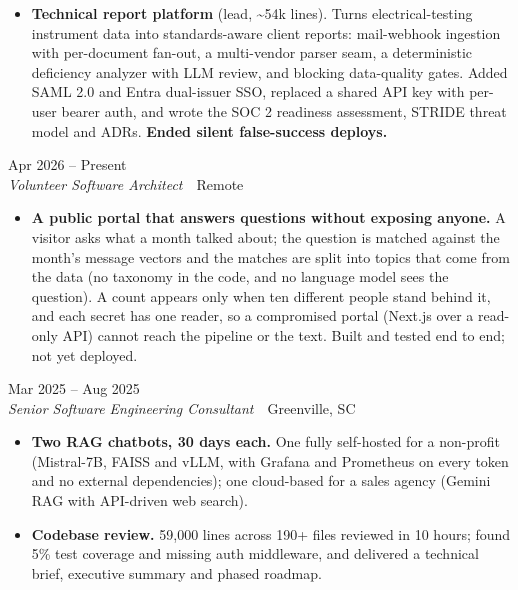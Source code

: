 \documentclass[10pt,letterpaper]{article}
\newcommand{\szmeta}{\fontsize{8pt}{10pt}\selectfont}
\begin{document}
\begin{itemize}
\item \textbf{Technical report platform} {\color{muted}(lead, \textasciitilde{}54k lines)}. Turns electrical-testing instrument data into standards-aware client reports: mail-webhook ingestion with per-document fan-out, a multi-vendor parser seam, a deterministic deficiency analyzer with LLM review, and blocking data-quality gates. Added SAML 2.0 and Entra dual-issuer SSO, replaced a shared API key with per-user bearer auth, and wrote the SOC 2 readiness assessment, STRIDE threat model and ADRs. \textbf{Ended silent false-success deploys.}
\end{itemize}
\vspace{3pt}
 \hfill {\color{muted}\szmeta Apr 2026 – Present}\\[1pt]
{\itshape Volunteer Software Architect}{\color{muted}\ \textbullet\ Remote}
\vspace{2pt}
\begin{itemize}
\item \textbf{A public portal that answers questions without exposing anyone.} A visitor asks what a month talked about; the question is matched against the month's message vectors and the matches are split into topics that come from the data (no taxonomy in the code, and no language model sees the question). A count appears only when ten different people stand behind it, and each secret has one reader, so a compromised portal (Next.js over a read-only API) cannot reach the pipeline or the text. Built and tested end to end; not yet deployed.
\end{itemize}
\vspace{3pt}
 \hfill {\color{muted}\szmeta Mar 2025 – Aug 2025}\\[1pt]
{\itshape Senior Software Engineering Consultant}{\color{muted}\ \textbullet\ Greenville, SC}
\vspace{2pt}
\begin{itemize}
\item \textbf{Two RAG chatbots, 30 days each.} One fully self-hosted for a non-profit (Mistral-7B, FAISS and vLLM, with Grafana and Prometheus on every token and no external dependencies); one cloud-based for a sales agency (Gemini RAG with API-driven web search).
\item \textbf{Codebase review.} 59,000 lines across 190+ files reviewed in 10 hours; found 5\% test coverage and missing auth middleware, and delivered a technical brief, executive summary and phased roadmap.
\end{itemize}
\end{document}
